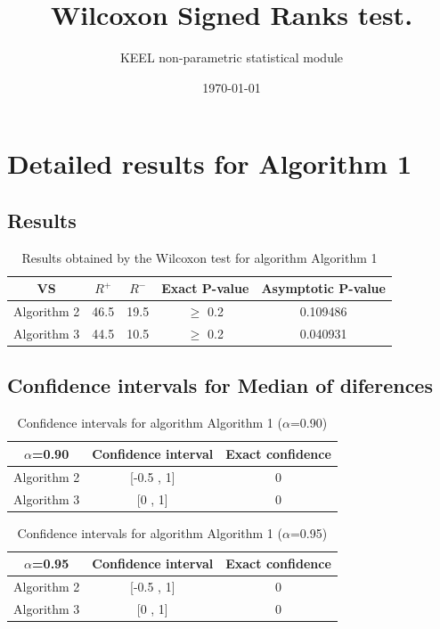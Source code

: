 \documentclass[a4paper,10pt]{article}
\title{Wilcoxon Signed Ranks test.}
\date{\today}
\author{KEEL non-parametric statistical module}
\begin{document}
\pagestyle{empty}
\maketitle
\thispagestyle{empty}



\section{Detailed results for Algorithm 1}


\subsection{Results}

\begin{table}[!htp]
\centering\small
\begin{tabular}{
|c|c|c|c|c|}
\hline
 VS & $R^{+}$ & $R^{-}$ & Exact P-value & Asymptotic P-value \\ \hline 
Algorithm 2 & 46.5 & 19.5 & $\geq$ 0.2 & 0.109486\\ \hline 
Algorithm 3 & 44.5 & 10.5 & $\geq$ 0.2 & 0.040931\\ \hline 

\end{tabular}
\caption{Results obtained by the Wilcoxon test for algorithm Algorithm 1}
\end{table}

\subsection{Confidence intervals for Median of diferences}

\begin{table}[!htp]
\centering\small
\begin{tabular}{
|c|c|c|}
\hline
 $\alpha$=0.90 & Confidence interval & Exact confidence \\ \hline 
Algorithm 2 & [-0.5 , 1] & 0\\ \hline 
Algorithm 3 & [0 , 1] & 0\\ \hline 

\end{tabular}
\caption{Confidence intervals for algorithm Algorithm 1 ($\alpha$=0.90)}
\end{table}
\begin{table}[!htp]
\centering\small
\begin{tabular}{
|c|c|c|}
\hline
 $\alpha$=0.95 & Confidence interval & Exact confidence \\ \hline 
Algorithm 2 & [-0.5 , 1] & 0\\ \hline 
Algorithm 3 & [0 , 1] & 0\\ \hline 

\end{tabular}
\caption{Confidence intervals for algorithm Algorithm 1 ($\alpha$=0.95)}
\end{table}
\end{document}

